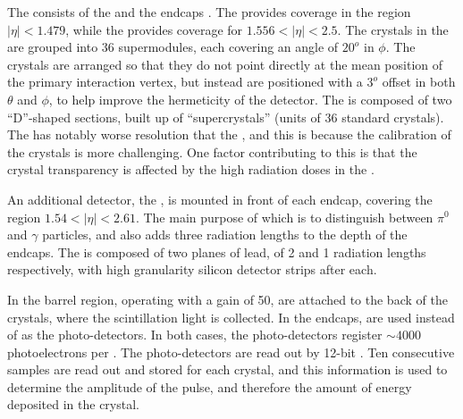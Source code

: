 The \ECAL consists of the \EB and the endcaps \EE. The \EB provides coverage in the region $|\eta| < 1.479$, while the \EE provides coverage for $1.556 < |\eta| < 2.5$. The crystals in the \EB are grouped into 36 supermodules, each covering an angle of $20^o$ in $\phi$. The crystals are arranged so that they do not point directly at the mean position of the primary interaction vertex, but instead are positioned with a $3^o$ offset in both $\theta$ and $\phi$, to help improve the hermeticity of the detector. The \EE is composed of two ``D''-shaped sections, built up of ``supercrystals'' (units of 36 standard crystals). The \EE has notably worse resolution that the \EB, and this is because the calibration of the crystals is more challenging. One factor contributing to this is that the crystal transparency is affected by the high radiation doses in the \EE. %

An additional detector, the \ES, is mounted in front of each endcap, covering the region $1.54 <|\eta| < 2.61$. The main purpose of which is to distinguish between $\pi^0$ and $\gamma$ particles, and also adds three radiation lengths to the depth of the \ECAL endcaps. The \ES is composed of two planes of lead, of 2 and 1 radiation lengths respectively, with high granularity silicon detector strips after each. %

In the barrel region, \APDs operating with a gain of 50, are attached to the back of the crystals, where the scintillation light is collected. In the endcaps, \VPTs are used instead of \APDs as the photo-detectors. In both cases, the photo-detectors register $\sim 4000 $ photoelectrons per \GeV. The photo-detectors are read out by 12-bit \ADC. Ten consecutive samples are read out and stored for each crystal, and this information is used to determine the amplitude of the pulse, and therefore the amount of energy deposited in the crystal.


